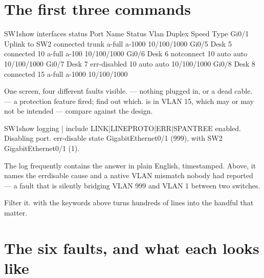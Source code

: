 \section{The first three commands}

\begin{verify}{SW1}{show interfaces status}
Port      Name               Status       Vlan       Duplex  Speed Type
Gi0/1     Uplink to SW2      connected    trunk      a-full a-1000 10/100/1000
Gi0/5     Desk 5             connected    10         a-full  a-100 10/100/1000
Gi0/6     Desk 6             notconnect   10           auto   auto 10/100/1000
Gi0/7     Desk 7             err-disabled 10           auto   auto 10/100/1000
Gi0/8     Desk 8             connected    15         a-full a-1000 10/100/1000
\end{verify}

One screen, four different faults visible.   --- nothing
plugged in, or a dead cable.   --- a protection
feature fired; find out which.  is in VLAN 15, which may or may not be
intended --- compare against the design.

\begin{verify}{SW1}{show logging | include LINK|LINEPROTO|ERR|SPANTREE}
   enabled. Disabling port.
   err-disable state
   GigabitEthernet0/1 (999), with SW2 GigabitEthernet0/1 (1).
\end{verify}

\begin{alertbox}
The log frequently contains the answer in plain English, timestamped. Above, it
names the errdisable cause and a native VLAN mismatch nobody had reported --- a
fault that is silently bridging VLAN 999 and VLAN 1 between two switches.

Filter it.  with the keywords above turns hundreds of
lines into the handful that matter.
\end{alertbox}

\section{The six faults, and what each looks like}

